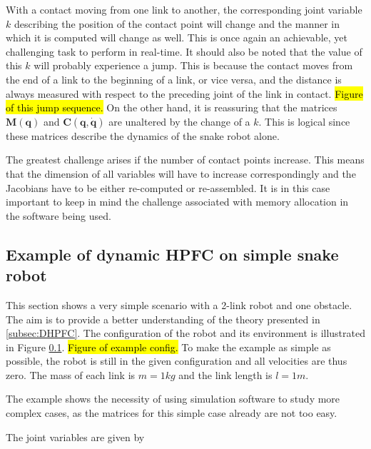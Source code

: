 With a contact moving from one link to another, the corresponding joint variable $k$ describing the position of the contact point will change and the manner in which it is computed will change as well. This is once again an achievable, yet challenging task to perform in real-time. It should also be noted that the value of this $k$ will probably experience a jump. This is because the contact moves from the end of a link to the beginning of a link, or vice versa, and the distance is always measured with respect to the preceding joint of the link in contact. \hl{Figure of this jump sequence.} On the other hand, it is reassuring that the matrices $\mathbf{M(q)}$ and $\mathbf{C(q,\dot{q})}$ are unaltered by the change of a $k$. This is logical since these matrices describe the dynamics of the snake robot alone.

The greatest challenge arises if the number of contact points increase. This means that the dimension of all variables will have to increase correspondingly and the Jacobians have to be either re-computed or re-assembled. It is in this case important to keep in mind the challenge associated with memory allocation in the software being used.



\subsection{Example of dynamic HPFC on simple snake robot}

This section shows a very simple scenario with a 2-link robot and one obstacle. The aim is to provide a better understanding of the theory presented in \ref{subsec:DHPFC}. The configuration of the robot and its environment is illustrated in Figure \ref{}. \hl{Figure of example config.} To make the example as simple as possible, the robot is still in the given configuration and all velocities are thus zero. The mass of each link is $m = 1 kg$ and the link length is $l=1 m$.

The example shows the necessity of using simulation software to study more complex cases, as the matrices for this simple case already are not too easy.

The joint variables are given by

